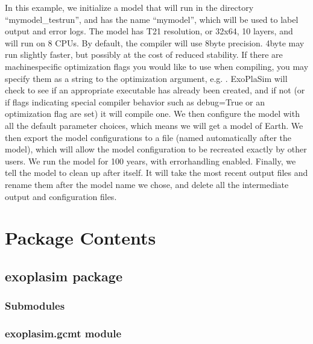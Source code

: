 \documentclass[letterpaper,10pt,english]{sphinxmanual}
\begin{document}
In this example, we initialize a model that will run in the directory
“mymodel\_testrun”, and has the name “mymodel”, which will be used to
label output and error logs. The model has T21 resolution, or 32x64,
10 layers, and will run on 8 CPUs. By default, the compiler will use
8\sphinxhyphen{}byte precision. 4\sphinxhyphen{}byte may run slightly faster, but possibly at the
cost of reduced stability. If there are machine\sphinxhyphen{}specific optimization
flags you would like to use when compiling, you may specify them as a
string to the optimization argument, e.g. . ExoPlaSim
will check to see if an appropriate executable has already been created,
and if not (or if flags indicating special compiler behavior such as
debug=True or an optimization flag are set) it will compile one. We then
configure the model with all the default parameter choices, which means
we will get a model of Earth. We then export the model configurations
to a  file (named automatically after the model), which will allow
the model configuration to be recreated exactly by other users. We
run the model for 100 years, with error\sphinxhyphen{}handling enabled. Finally, we
tell the model to clean up after itself. It will take the most recent
output files and rename them after the model name we chose, and delete
all the intermediate output and configuration files.


\section{Package Contents}
\label{\detokenize{index:package-contents}}

\subsection{exoplasim package}
\label{\detokenize{source/exoplasim:exoplasim-package}}\label{\detokenize{source/exoplasim::doc}}

\subsubsection{Submodules}
\label{\detokenize{source/exoplasim:submodules}}

\subsubsection{exoplasim.gcmt module}
\label{\detokenize{source/exoplasim:module-exoplasim.gcmt}}\label{\detokenize{source/exoplasim:exoplasim-gcmt-module}}
\end{document}
